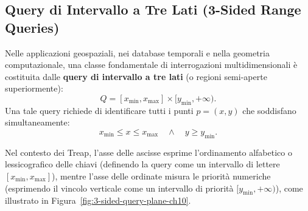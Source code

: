 \FloatBarrier
\subsection{Query di Intervallo a Tre Lati (3-Sided Range Queries)}
Nelle applicazioni geospaziali, nei database temporali e nella geometria computazionale, una classe fondamentale di interrogazioni multidimensionali \`e costituita dalle \textbf{query di intervallo a tre lati} (o regioni semi-aperte superiormente):
\begin{equation}
  Q = [x_{\min}, x_{\max}] \times [y_{\min}, +\infty).
\end{equation}
Una tale query richiede di identificare tutti i punti $p = (x, y)$ che soddisfano simultaneamente:
\begin{equation}
  x_{\min} \le x \le x_{\max} \quad \land \quad y \ge y_{\min}.
\end{equation}

Nel contesto dei Treap, l'asse delle ascisse esprime l'ordinamento alfabetico o lessicografico delle chiavi (definendo la query come un intervallo di lettere $[x_{\min}, x_{\max}]$), mentre l'asse delle ordinate misura le priorit\`a numeriche (esprimendo il vincolo verticale come un intervallo di priorit\`a $[y_{\min}, +\infty)$), come illustrato in Figura~\ref{fig:3-sided-query-plane-ch10}.

